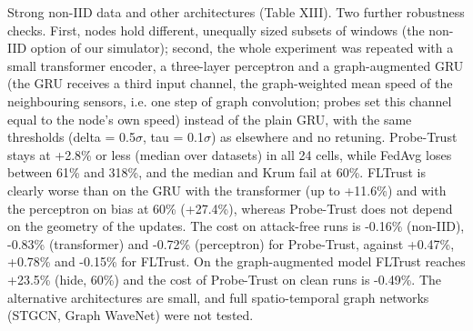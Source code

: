 \documentclass[journal]{IEEEtran}
\begin{document}
Strong non-IID data and other architectures (Table XIII). Two further robustness checks. First, nodes hold different, unequally sized subsets of windows (the non-IID option of our simulator); second, the whole experiment was repeated with a small transformer encoder, a three-layer perceptron and a graph-augmented GRU (the GRU receives a third input channel, the graph-weighted mean speed of the neighbouring sensors, i.e. one step of graph convolution; probes set this channel equal to the node's own speed) instead of the plain GRU, with the same thresholds (delta = 0.5\ensuremath{\sigma}, tau = 0.1\ensuremath{\sigma}) as elsewhere and no retuning. Probe-Trust stays at +2.8\% or less (median over datasets) in all 24 cells, while FedAvg loses between 61\% and 318\%, and the median and Krum fail at 60\%. FLTrust is clearly worse than on the GRU with the transformer (up to +11.6\%) and with the perceptron on bias at 60\% (+27.4\%), whereas Probe-Trust does not depend on the geometry of the updates. The cost on attack-free runs is -0.16\% (non-IID), -0.83\% (transformer) and -0.72\% (perceptron) for Probe-Trust, against +0.47\%, +0.78\% and -0.15\% for FLTrust. On the graph-augmented model FLTrust reaches +23.5\% (hide, 60\%) and the cost of Probe-Trust on clean runs is -0.49\%. The alternative architectures are small, and full spatio-temporal graph networks (STGCN, Graph WaveNet) were not tested.
\end{document}
